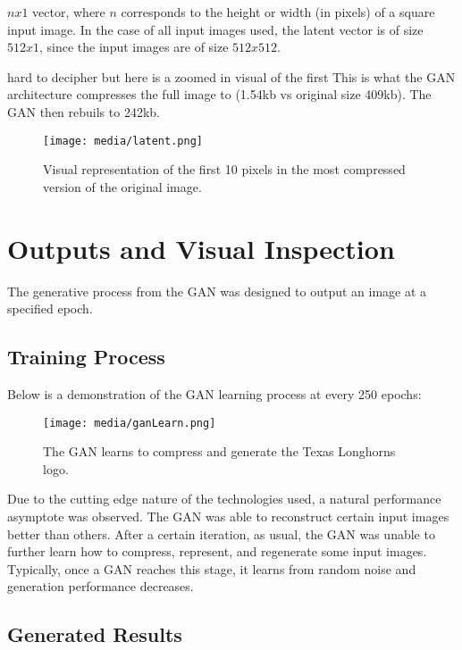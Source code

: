 $nx1$ vector, where $n$ corresponds to the height or width (in pixels)
of a square input image. In the case of all input images used, the latent vector
is of size $512x1$, since the input images are of size $512x512$.

hard to decipher but here is a zoomed in visual of the first
This is what the GAN architecture compresses the full image to (1.54kb vs original size 409kb).
The GAN then rebuils to 242kb.


\begin{figure}[H]
	\begin{center}
	\texttt{[image: media/latent.png]}
	\end{center}
	\caption[Latent Space Representation]{Visual representation of the first 10 pixels in the most compressed version of the original image.}
	\end{figure}

\section{Outputs and Visual Inspection}
The generative process from the GAN was designed to output an image at a specified epoch.

\subsection{Training Process}
Below is a demonstration of the GAN learning process at every 250 epochs:
\begin{figure}[H]
	\begin{center}
	\texttt{[image: media/ganLearn.png]}
	\end{center}
	\caption[GAN Training Process]{The GAN learns to compress and generate the Texas Longhorns logo.}
	\end{figure}

Due to the cutting edge nature of the technologies used, a natural performance asymptote
was observed. The GAN was able to reconstruct certain input images better than others.
After a certain iteration, as usual, the GAN was unable to further learn how to compress,
represent, and regenerate some input images. Typically, once a GAN reaches this stage,
it learns from random noise and generation performance decreases.

\subsection{Generated Results}

